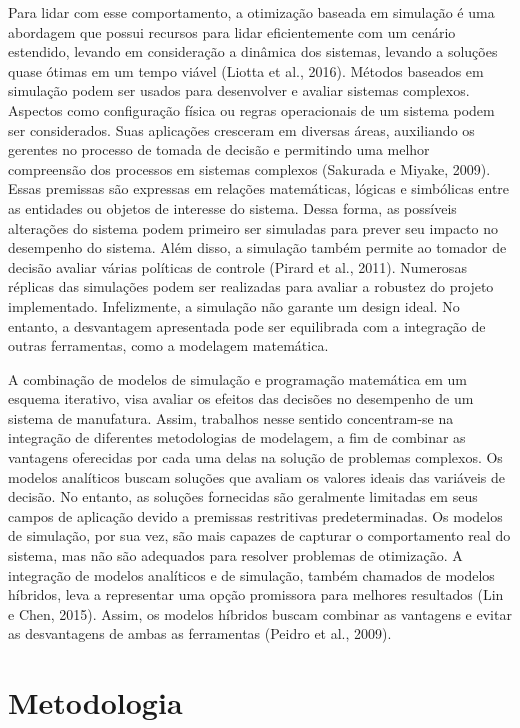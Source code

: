 \documentclass[
]{book}
\begin{document}
Para lidar com esse comportamento, a otimização baseada em simulação é uma abordagem que possui recursos para lidar eficientemente com um cenário estendido, levando em consideração a dinâmica dos sistemas, levando a soluções quase ótimas em um tempo viável (Liotta et al., 2016). Métodos baseados em simulação podem ser usados para desenvolver e avaliar sistemas complexos. Aspectos como configuração física ou regras operacionais de um sistema podem ser considerados. Suas aplicações cresceram em diversas áreas, auxiliando os gerentes no processo de tomada de decisão e permitindo uma melhor compreensão dos processos em sistemas complexos (Sakurada e Miyake, 2009). Essas premissas são expressas em relações matemáticas, lógicas e simbólicas entre as entidades ou objetos de interesse do sistema. Dessa forma, as possíveis alterações do sistema podem primeiro ser simuladas para prever seu impacto no desempenho do sistema. Além disso, a simulação também permite ao tomador de decisão avaliar várias políticas de controle (Pirard et al., 2011). Numerosas réplicas das simulações podem ser realizadas para avaliar a robustez do projeto implementado. Infelizmente, a simulação não garante um design ideal. No entanto, a desvantagem apresentada pode ser equilibrada com a integração de outras ferramentas, como a modelagem matemática.

A combinação de modelos de simulação e programação matemática em um esquema iterativo, visa avaliar os efeitos das decisões no desempenho de um sistema de manufatura. Assim, trabalhos nesse sentido concentram-se na integração de diferentes metodologias de modelagem, a fim de combinar as vantagens oferecidas por cada uma delas na solução de problemas complexos. Os modelos analíticos buscam soluções que avaliam os valores ideais das variáveis de decisão. No entanto, as soluções fornecidas são geralmente limitadas em seus campos de aplicação devido a premissas restritivas predeterminadas. Os modelos de simulação, por sua vez, são mais capazes de capturar o comportamento real do sistema, mas não são adequados para resolver problemas de otimização. A integração de modelos analíticos e de simulação, também chamados de modelos híbridos, leva a representar uma opção promissora para melhores resultados (Lin e Chen, 2015). Assim, os modelos híbridos buscam combinar as vantagens e evitar as desvantagens de ambas as ferramentas (Peidro et al., 2009).

\hypertarget{metodologia}{%
\chapter{Metodologia}\label{metodologia}}
\end{document}
